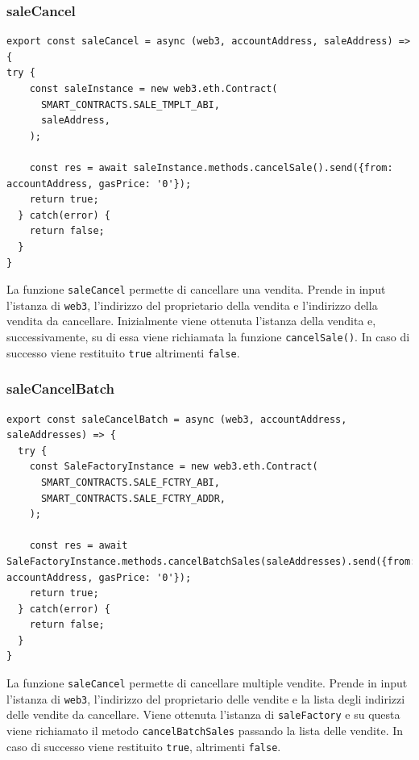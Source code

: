 \documentclass[a4paper]{article}
\begin{document}
        \subsubsection{saleCancel}
        \begin{lstlisting}[style=ES6, title={Funzione saleCancel}]
export const saleCancel = async (web3, accountAddress, saleAddress) => {
try {
    const saleInstance = new web3.eth.Contract(
      SMART_CONTRACTS.SALE_TMPLT_ABI,
      saleAddress,
    );

    const res = await saleInstance.methods.cancelSale().send({from: accountAddress, gasPrice: '0'});
    return true;
  } catch(error) {
    return false;
  }
}\end{lstlisting}
        La funzione \verb|saleCancel| permette di cancellare una vendita. Prende in input l'istanza di \verb|web3|, l'indirizzo del proprietario della vendita e l'indirizzo della vendita da cancellare.
        Inizialmente viene ottenuta l'istanza della vendita e, successivamente, su di essa viene richiamata la funzione \verb|cancelSale()|. In caso di successo viene restituito \verb|true| altrimenti \verb|false|.

        \subsubsection{saleCancelBatch}
        \begin{lstlisting}[style=ES6, title={Funzione saleCancelBatch}]
export const saleCancelBatch = async (web3, accountAddress, saleAddresses) => {
  try {
    const SaleFactoryInstance = new web3.eth.Contract(
      SMART_CONTRACTS.SALE_FCTRY_ABI,
      SMART_CONTRACTS.SALE_FCTRY_ADDR,
    );

    const res = await SaleFactoryInstance.methods.cancelBatchSales(saleAddresses).send({from: accountAddress, gasPrice: '0'});
    return true;
  } catch(error) {
    return false;
  }
}\end{lstlisting}
        La funzione \verb|saleCancel| permette di cancellare multiple vendite. Prende in input l'istanza di \verb|web3|, l'indirizzo del proprietario delle vendite e la lista degli indirizzi delle vendite da cancellare.
        \newline
        Viene ottenuta l'istanza di \verb|saleFactory| e su questa viene richiamato il metodo \verb|cancelBatchSales| passando la lista delle vendite. In caso di successo viene restituito \verb|true|, altrimenti \verb|false|.
\end{document}
